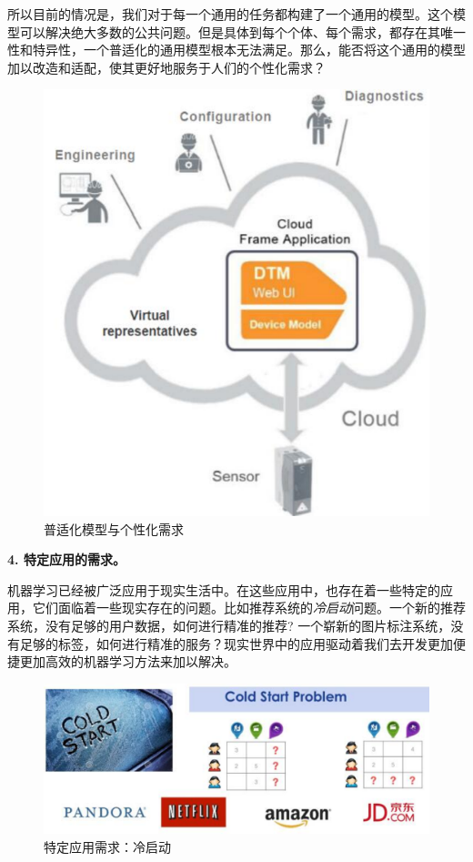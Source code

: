 所以目前的情况是，我们对于每一个通用的任务都构建了一个通用的模型。这个模型可以解决绝大多数的公共问题。但是具体到每个个体、每个需求，都存在其唯一性和特异性，一个普适化的通用模型根本无法满足。那么，能否将这个通用的模型加以改造和适配，使其更好地服务于人们的个性化需求？

\begin{figure}[htbp]
	\centering
	\includegraphics[scale=0.45]{./figures/fig-introduction-model.pdf}
	\caption{普适化模型与个性化需求}
	\label{fig-privacy}
\end{figure}

\textbf{4. 特定应用的需求。}

机器学习已经被广泛应用于现实生活中。在这些应用中，也存在着一些特定的应用，它们面临着一些现实存在的问题。比如推荐系统的\textit{冷启动}问题。一个新的推荐系统，没有足够的用户数据，如何进行精准的推荐? 一个崭新的图片标注系统，没有足够的标签，如何进行精准的服务？现实世界中的应用驱动着我们去开发更加便捷更加高效的机器学习方法来加以解决。

\begin{figure}[htbp]
	\centering
	\includegraphics[scale=0.45]{./figures/fig-introduction-coldstart.pdf}
	\caption{特定应用需求：冷启动}
	\label{fig-coldstart}
\end{figure}

